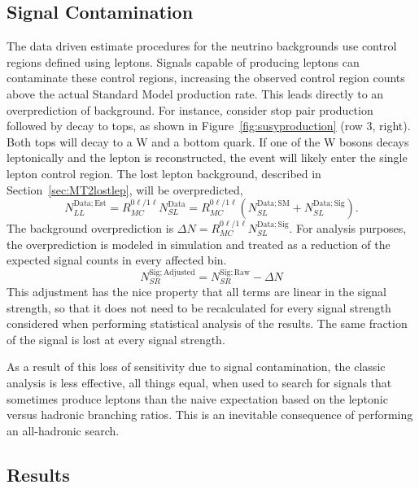   \subsection{Signal Contamination} \label{sec:MT2sigcontam}

  The data driven estimate procedures for the neutrino backgrounds use control regions defined using leptons.
  Signals capable of producing leptons can contaminate these control regions, increasing the observed control region counts above the actual Standard Model production rate.
  This leads directly to an overprediction of background.
  For instance, consider stop pair production followed by decay to tops, as shown in Figure~\ref{fig:susyproduction} (row 3, right).
  Both tops will decay to a W and a bottom quark.
  If one of the W bosons decays leptonically and the lepton is reconstructed, the event will likely enter the single lepton control region.
  The lost lepton background, described in Section~\ref{sec:MT2lostlep}, will be overpredicted,
  \begin{equation}
    N_{LL}^{\mathrm{Data;Est}} = R_{MC}^{0\ell/1\ell} N_{SL}^{\mathrm{Data}} = R_{MC}^{0\ell/1\ell} \left(N_{SL}^{\mathrm{Data;SM}} + N_{SL}^{\mathrm{Data;Sig}}\right).
  \end{equation}
  The background overprediction is $\Delta N = R_{MC}^{0\ell/1\ell}N_{SL}^{\mathrm{Data;Sig}}$.
  For analysis purposes, the overprediction is modeled in simulation and treated as a reduction of the expected signal counts in every affected bin.
  \begin{equation}
    N_{SR}^{\mathrm{Sig;Adjusted}} = N_{SR}^{\mathrm{Sig;Raw}} - \Delta N
  \end{equation}
  This adjustment has the nice property that all terms are linear in the signal strength, so that it does not need to be recalculated for every signal strength considered when performing statistical analysis of the results.
  The same fraction of the signal is lost at every signal strength.
  
  As a result of this loss of sensitivity due to signal contamination, the classic analysis is less effective, all things equal, when used to search for signals that sometimes produce leptons than the naive expectation based on the leptonic versus hadronic branching ratios.
  This is an inevitable consequence of performing an all-hadronic search.

  \subsection{Results} \label{sec:MT2results}

